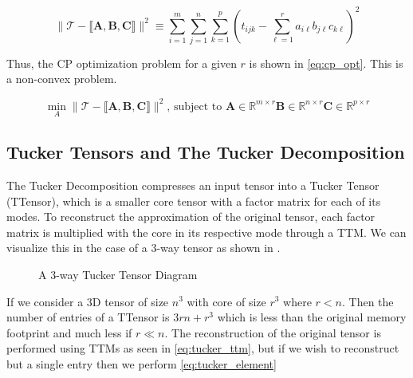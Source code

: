     \begin{equation} \label{eq:cp_least_squares}
        \|\mathcal{T} - \llbracket \mathbf{A, B, C} \rrbracket \|^2 \equiv \sum_{i=1}^{m} \sum_{j=1}^{n} \sum_{k=1}^{p}\left(t_{ijk} - \sum_{\ell=1}^{r} a_{i\ell}b_{j\ell}c_{k\ell} \right)^2
    \end{equation}

    Thus, the CP optimization problem for a given $r$ is shown in
    \ref{eq:cp_opt}. This is a non-convex problem. 

    \begin{equation} \label{eq:cp_opt}
        \min_{A} \|\mathcal{T} - \llbracket \mathbf{A, B, C} \rrbracket \|^2 \text{, subject to } \mathbf{A} \in \mathbb{R}^{m\times r} \mathbf{B} \in \mathbb{R}^{n\times r} \mathbf{C} \in \mathbb{R}^{p\times r}
    \end{equation}
        




\subsection{Tucker Tensors and The Tucker Decomposition} \label{sec:Tucker Tensors and The Tucker Decomposition}
    The Tucker Decomposition compresses an input tensor into a Tucker Tensor
    (TTensor), which is a smaller core tensor with a factor matrix for each of
    its modes. To reconstruct the approximation of the original tensor, each
    factor matrix is multiplied with the core in its respective mode through a
    TTM. We can visualize this in the case of a 3-way tensor as shown in
    .

    \begin{figure}[ht]
        \centering
        
        \caption[A 3-way Tucker Tensor Diagram]{A 3-way Tucker Tensor Diagram}
        \label{fig:TTensor}
    \end{figure}

    If we consider a 3D tensor of size $n^3$ with core of size $r^3$ where $r <
    n$. Then the number of entries of a TTensor is $3rn + r^3$ which is less
    than the original memory footprint and much less if $r \ll n$. The
    reconstruction of the original tensor is performed using TTMs as seen in
    \ref{eq:tucker_ttm}, but if we wish to reconstruct but a single entry then
    we perform \ref{eq:tucker_element}

